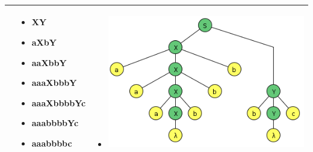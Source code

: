 \documentclass{article}
\begin{document}
\begin{enumerate} [(a)]
\begin{tabular}{|p{3.5cm}|p{3.5cm}|p{8cm}|  }
\begin{itemize}[label={}]
        \end{itemize}
        &
        \begin{itemize}[label={}]
             
             \item XY 
         	\item aXbY 
         \item	aaXbbY 
         \item	aaaXbbbY 
         \item	aaaXbbbbYc 
         \item	aaabbbbYc 
         \item	aaabbbbc 
         
        \end{itemize}
        &
         \begin{itemize}[label={}]
             \item \includegraphics[scale=0.40]{img/2g-aaabbbbc.png}
        \end{itemize}
        
         
        \\ \hline
        \end{tabular}
	\end{enumerate}
    
\end{document}
